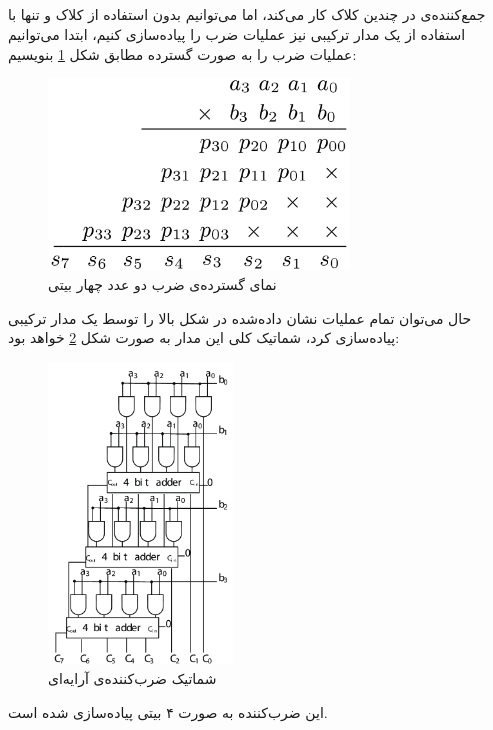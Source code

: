 \documentclass{article}
\begin{document}
\subsection{}
جمع‌کننده‌ی  در چندین کلاک کار می‌کند، اما می‌توانیم بدون استفاده از کلاک و تنها با استفاده از یک مدار ترکیبی نیز عملیات ضرب را پیاده‌سازی کنیم، ابتدا می‌توانیم عملیات ضرب را به صورت گسترده مطابق شکل \ref{fig:array_multiplication} بنویسیم:
\begin{figure}[H]
\centering
\includegraphics[width=8cm]{array_multiplication}
\caption{نمای گسترده‌ی ضرب دو عدد چهار بیتی}
\label{fig:array_multiplication}
\end{figure}
حال می‌توان تمام عملیات نشان داده‌شده در شکل بالا را توسط یک مدار ترکیبی پیاده‌سازی کرد، شماتیک کلی این مدار به صورت شکل \ref{fig:4-bit-array-multiplier} خواهد بود:
\begin{figure}[H]
\centering
\includegraphics[height=8cm]{4-bit-array-multiplier}
\caption{شماتیک ضرب‌کننده‌ی آرایه‌ای}
\label{fig:4-bit-array-multiplier}
\end{figure}
این ضرب‌کننده به صورت ۴ بیتی پیاده‌سازی شده است.
\end{document}

